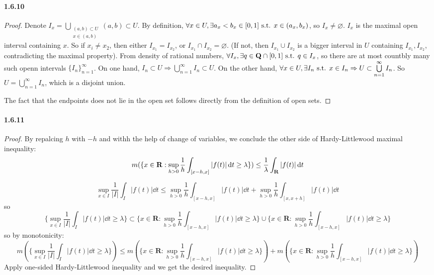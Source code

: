 \documentclass{article}
\begin{document}
\paragraph{1.6.10}
\begin{proof}
Denote $I_x=\bigcup\limits_{\substack {(a,b)\subset U\\x\in (a,b)}}(a,b)\subset U$. By definition, $\forall x\in U,\exists a_x<b_x\in [0,1]\text{ s.t. } x\in (a_x,b_x)$, so $I_x\neq\varnothing$. $I_x$ is the maximal open interval containing $x$. So if $x_i\neq x_2$, then either $I_{x_1}=I_{x_2}$, or $I_{x_1}\cap I_{x_2}=\varnothing$. (If not, then $I_{x_1}\cup I_{x_2}$ is a bigger interval in $U$ containing $I_{x_1},I_{x_2}$, contradicting the maximal property). From density of rational numbers, $\forall I_{x},\exists q\in\mathbf{Q}\cap [0,1]\text{ s.t. } q\in I_{x}$, so there are at most countbly many such openn intervals $\{I_{n}\}_{n=1}^\infty$. On one hand, $I_n\subset U\Rightarrow \bigcup\limits_{n=1}^\infty I_n\subset U$. On the other hand, $\forall x\in U,\exists I_n\text{ s.t. } x\in I_n\Rightarrow U\subset \bigcup\limits_{n=1}^\infty I_n$. So $U=\bigcup\limits_{n=1}^\infty I_n$, which is a disjoint union. 

The fact that the endpoints does not lie in the open set follows directly from the definition of open sets.
\end{proof}

\paragraph{1.6.11}
\begin{proof}
By repalcing $h$ with $-h$ and withh the help of change of variables, we conclude the other side of Hardy-Littlewood maximal inequality:
\[m(\{x\in\mathbf{R}:\sup\limits_{h>0}\frac{1}{h}\int_{[x-h,x]}|f(t)|\,\mathrm{d} t\geq \lambda\})\leq \frac{1}{\lambda}\int_{\mathbf{R}}|f(t)|\,\mathrm{d} t\]

\[\sup\limits_{x\in I}\frac{1}{|I|}\int_{I}|f(t)|\dd t\leq\sup\limits_{h>0}\frac{1}{h}\int_{[x-h,x]}|f(t)|\dd t+ \sup\limits_{h>0}\frac{1}{h}\int_{[x,x+h]}|f(t)|\dd t\]
so
\[\{\sup\limits_{x\in I}\frac{1}{|I|}\int_{I}|f(t)|\dd t\geq \lambda\}\subset\{x\in\mathbf{R}:\sup\limits_{h>0}\frac{1}{h}\int_{[x-h,x]}|f(t)|\dd t\geq \lambda\}\cup\{x\in\mathbf{R}:\sup\limits_{h>0}\frac{1}{h}\int_{[x-h,x]}|f(t)|\dd t\geq \lambda\}\]
so by monotonicity:
\[m(\{\sup\limits_{x\in I}\frac{1}{|I|}\int_{I}|f(t)|\dd t\geq \lambda\})\leq m(\{x\in\mathbf{R}:\sup\limits_{h>0}\frac{1}{h}\int_{[x-h,x]}|f(t)|\dd t\geq \lambda\})+ m(\{x\in\mathbf{R}:\sup\limits_{h>0}\frac{1}{h}\int_{[x-h,x]}|f(t)|\dd t\geq \lambda\})\]
Apply one-sided Hardy-Littlewood inequality and we get the desired inequality.
\end{proof}
\end{document}
